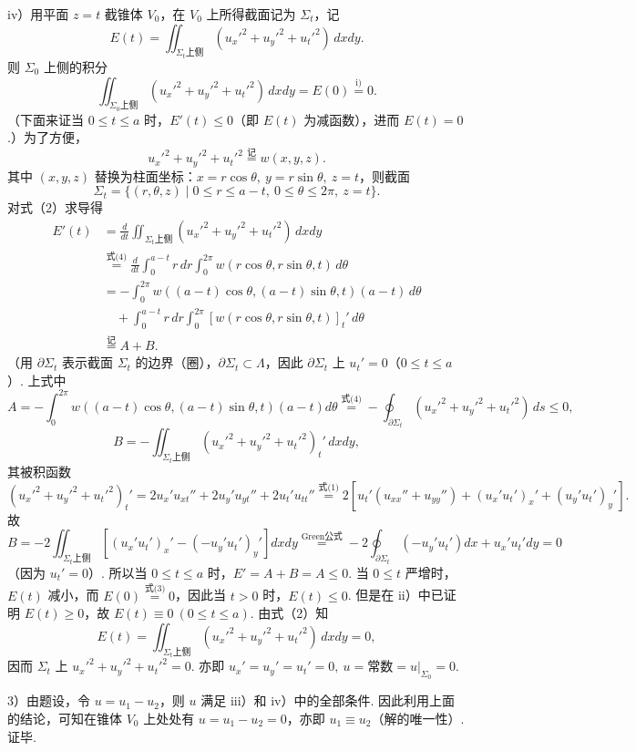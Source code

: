 \documentclass[UTF8, 12pt, fontset=fandol, oneside]{ctexart}
\providecommand{\xlongequal}[1]{\overset{#1}{=}}
\begin{document}
iv）用平面 $z=t$ 截锥体 $V_0$，在 $V_0$ 上所得截面记为 $\Sigma_t$，记
\[
E(t)=\iint_{\Sigma_t\text{上侧}}(u_x'^2+u_y'^2+u_t'^2)\,dxdy. \tag{2}
\]
则 $\Sigma_0$ 上侧的积分
\[
\iint_{\Sigma_0\text{上侧}}(u_x'^2+u_y'^2+u_t'^2)\,dxdy=E(0)\xlongequal{\text{i)}}0. \tag{3}
\]
（下面来证当 $0\le t\le a$ 时，$E'(t)\le0$（即 $E(t)$ 为减函数），进而 $E(t)=0$.）为了方便，
\[
u_x'^2+u_y'^2+u_t'^2\overset{\text{记}}=w(x,y,z). \tag{4}
\]
其中 $(x,y,z)$ 替换为柱面坐标：$x=r\cos\theta,\ y=r\sin\theta,\ z=t$，则截面
\[
\Sigma_t=\{(r,\theta,z)\mid0\le r\le a-t,\ 0\le\theta\le2\pi,\ z=t\}.
\]
对式（2）求导得
\[
\begin{aligned}
E'(t)&=\frac d{dt}\iint_{\Sigma_t\text{上侧}}(u_x'^2+u_y'^2+u_t'^2)\,dxdy\\
&\xlongequal{\text{式(4)}}\frac d{dt}\int_0^{a-t}r\,dr\int_0^{2\pi}w(r\cos\theta,r\sin\theta,t)\,d\theta\\
&=-\int_0^{2\pi}w((a-t)\cos\theta,(a-t)\sin\theta,t)(a-t)\,d\theta\\
&\quad+\int_0^{a-t}r\,dr\int_0^{2\pi}[w(r\cos\theta,r\sin\theta,t)]_t'\,d\theta\\
&\overset{\text{记}}=A+B.
\end{aligned}
\]
（用 $\partial\Sigma_t$ 表示截面 $\Sigma_t$ 的边界（圈），$\partial\Sigma_t\subset\Lambda$，因此 $\partial\Sigma_t$ 上 $u_t'=0$（$0\le t\le a$）. 上式中
\[
A=-\int_0^{2\pi}w((a-t)\cos\theta,(a-t)\sin\theta,t)(a-t)d\theta
\xlongequal{\text{式(4)}}-\oint_{\partial\Sigma_t}(u_x'^2+u_y'^2+u_t'^2)\,ds\le0,
\]
\[
B=-\iint_{\Sigma_t\text{上侧}}(u_x'^2+u_y'^2+u_t'^2)_t'\,dxdy,
\]
其被积函数
\[
(u_x'^2+u_y'^2+u_t'^2)_t'
=2u_x'u_{xt}''+2u_y'u_{yt}''+2u_t'u_{tt}''
\xlongequal{\text{式(1)}}2[u_t'(u_{xx}''+u_{yy}'')+(u_x'u_t')_x'+(u_y'u_t')_y'].
\]
故
\[
B=-2\iint_{\Sigma_t\text{上侧}}\left[(u_x'u_t')_x'-(-u_y'u_t')_y'\right]dxdy
\xlongequal{\text{Green公式}}-2\oint_{\partial\Sigma_t}(-u_y'u_t')dx+u_x'u_t'dy=0
\]
（因为 $u_t'=0$）. 所以当 $0\le t\le a$ 时，$E'=A+B=A\le0$. 当 $0\le t$ 严增时，$E(t)$ 减小，而 $E(0)\xlongequal{\text{式(3)}}0$，因此当 $t>0$ 时，$E(t)\le0$. 但是在 ii）中已证明 $E(t)\ge0$，故 $E(t)\equiv0\ (0\le t\le a)$. 由式（2）知
\[
E(t)=\iint_{\Sigma_t\text{上侧}}(u_x'^2+u_y'^2+u_t'^2)\,dxdy=0,
\]
因而 $\Sigma_t$ 上 $u_x'^2+u_y'^2+u_t'^2=0$. 亦即 $u_x'=u_y'=u_t'=0,\ u=\text{常数}=u|_{\Sigma_0}=0$.

3）由题设，令 $u=u_1-u_2$，则 $u$ 满足 iii）和 iv）中的全部条件. 因此利用上面的结论，可知在锥体 $V_0$ 上处处有 $u=u_1-u_2=0$，亦即 $u_1\equiv u_2$（解的唯一性）. 证毕.
\end{document}

